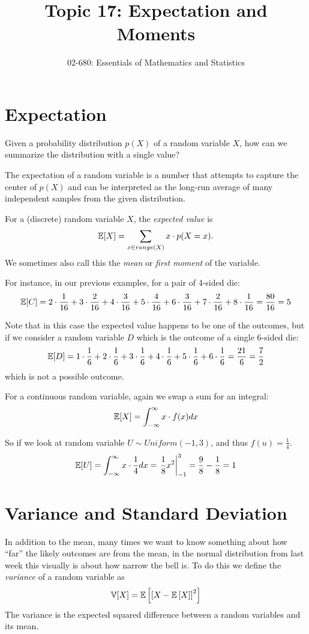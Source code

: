 


\title{Topic 17: Expectation and Moments}
\author{02-680: Essentials of Mathematics and Statistics}


\maketitle

\section{Expectation}
Given a probability distribution $p(X)$ of a random variable $X$, how can we summarize the distribution with a single value? 

The expectation of a random variable is a number that attempts to capture the center of $p(X)$ 
and can be interpreted as the long-run average of many independent samples from the given distribution.

For a (discrete) random variable $X$, the \emph{expected value} is 
\[\operatorname{\mathbb{E}}[X] = \sum_{x\in range(X)} x \cdot p(X=x).\]
We sometimes also call this the \emph{mean} or \emph{first moment} of the variable. 

For instance, in our previous examples, for a pair of 4-sided die: 
\[\operatorname{\mathbb{E}}[C] = 2 \cdot \frac{1}{16} + 3  \cdot \frac{2}{16} + 4 \cdot\frac{3}{16} + 5\cdot\frac{4}{16} + 6\cdot\frac{3}{16} + 7\cdot\frac{2}{16} + 8 \cdot \frac{1}{16} = \frac{80}{16} = 5\]

Note that in this case the expected value happens to be one of the outcomes, 
but if we consider a random variable $D$ which is the outcome of a single 6-sided die: 
\[\operatorname{\mathbb{E}}[D] = 1 \cdot \frac{1}{6} + 2 \cdot \frac{1}{6} + 3 \cdot \frac{1}{6} + 4 \cdot \frac{1}{6} + 5 \cdot \frac{1}{6} + 6 \cdot \frac{1}{6} = \frac{21}{6} = \frac{7}{2}\]
which is not a possible outcome. 

For a continuous random variable, again we swap a sum for an integral:
\[\operatorname{\mathbb{E}}[X] = \int_{-\infty}^\infty x \cdot f(x) dx\]

So if we look at random variable $U\sim Uniform(-1,3)$, and thus $f(u)=\frac{1}{4}$. 
\[\operatorname{\mathbb{E}}[U] = \int_{-\infty}^\infty x \cdot \frac{1}{4} dx = \left.\frac{1}{8} x^2 \right|_{-1}^3 = \frac{9}{8} - \frac{1}{8} = 1\]

\section{Variance and Standard Deviation}
In addition to the mean, many times we want to know something about how ``far'' the likely outcomes are from the mean,
in the normal distribution from last week this visually is about how narrow the bell is. 
To do this we define the \emph{variance} of a random variable as  
\[\operatorname{\mathbb{V}}[X] = \operatorname{\mathbb{E}}\left[\left[X-\operatorname{\mathbb{E}}\left[X\right]\right]^2\right]\]
The variance is the expected squared difference between a random variables and its mean. 

